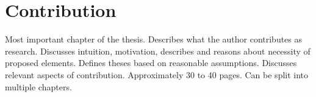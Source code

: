 \chapter{Contribution}

Most important chapter of the thesis. Describes what the author contributes as research. Discusses intuition, motivation, describes and reasons about necessity of proposed elements. Defines theses based on reasonable assumptions. Discusses relevant aspects of contribution. Approximately 30 to 40 pages. Can be split into multiple chapters.

